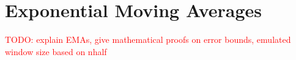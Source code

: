 \section{Exponential Moving Averages} \label{sec:emas}

\textcolor{red}{TODO: explain EMAs, give mathematical proofs on error bounds, emulated window size based on nhalf}




 



 

